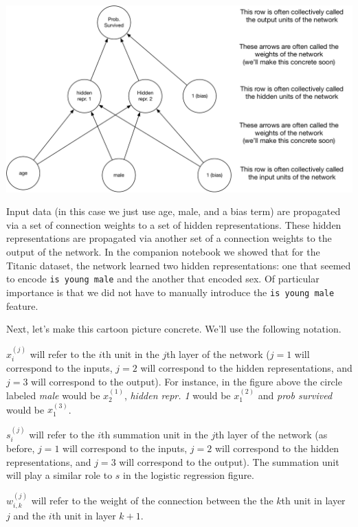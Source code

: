 \documentclass[assignment06_Solutions]{subfiles}
\begin{document}
\includegraphics[width=\linewidth]{figures/titanicmlpsimple}

Input data (in this case we just use age, male, and a bias term) are propagated via a set of connection weights to a set of hidden representations.  These hidden representations are propagated via another set of a connection weights to the output of the network.   In the companion notebook we showed that for the Titanic dataset, the network learned two hidden representations: one that seemed to encode {\tt is young male} and the another that encoded sex.  Of particular importance is that we did not have to manually introduce the {\tt is young male} feature.

Next, let's make this cartoon picture concrete.  We'll use the following notation.
\bi
\item $x^{(j)}_i$ will refer to the $i$th unit in the $j$th layer of the network ($j=1$ will correspond to the inputs, $j=2$ will correspond to the hidden representations, and $j=3$ will correspond to the output).  For instance, in the figure above the circle labeled \emph{male} would be $x^{(1)}_2$, \emph{hidden repr. 1} would be $x^{(2)}_1$ and \emph{prob survived} would be $x^{(3)}_1$.
\item $s^{(j)}_i$ will refer to the $i$th summation unit in the $j$th layer of the network (as before, $j=1$ will correspond to the inputs, $j=2$ will correspond to the hidden representations, and $j=3$ will correspond to the output).  The summation unit will play a similar role to $s$ in the logistic regression figure.
\item $w^{(j)}_{i,k}$ will refer to the weight of the connection between the the $k$th unit in layer $j$ and the $i$th unit in layer $k+1$.
\ei
\end{document}
